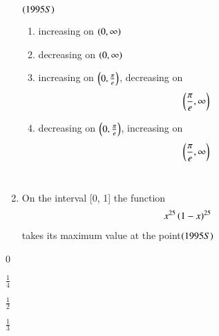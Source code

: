 \documentclass[journal,12pt,twocolumn]{IEEEtran}
\theoremstyle{remark}
\begin{document}
\begin{enumerate}
                               \hfill$\left(1995S\right)$\\

\begin{enumerate}
	\item increasing on $\left(0, \infty\right)$
	\item decreasing on $\left(0, \infty\right)$
	\item increasing on $\left(0, \frac{\pi}{e}\right)$,
		decreasing on \begin{align*}\left(\frac{\pi}{e}, \infty\right)\end{align*}
	\item decreasing on $\left(0, \frac{\pi}{e}\right)$,
		increasing on \begin{align*}\left(\frac{\pi}{e}, \infty\right)\end{align*}\\
\end{enumerate}

	\item On the interval [0, 1] the function\begin{align*}x^{25}\left(1-x\right)^{25}\end{align*} takes 
its maximum value at the point\hfill$\left(1995S\right)$
\end{enumerate}

\begin{enumerate}
\begin{multicols}{4}
	\item 0 
	\item $\frac{1}{4}$ 
	\item $\frac{1}{2}$ 
        \item $\frac{1}{3}$
\end{multicols}
\end{enumerate}

\newpage
\bigskip
\renewcommand{\thefigure}
{\theenumi}
\renewcommand{\thetable}
{\theenumi}
\end{document}

